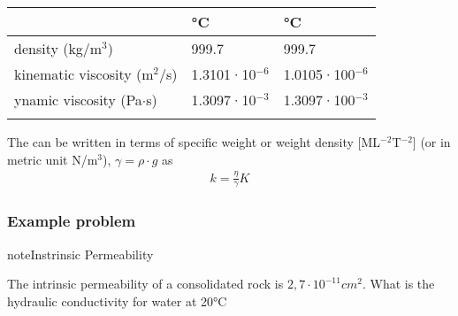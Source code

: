 \documentclass[letterpaper,10pt,english]{sphinxmanual}
\begin{document}
\begin{savenotes}\sphinxattablestart
\centering
\begin{tabulary}{\linewidth}[t]{|T|T|T|}
\hline


&°C
&°C
\\
\hline
density (kg/m\(^3\))
&
999.7
&
999.7
\\
\hline
kinematic viscosity (m\(^2\)/s)
&
1.3101·10\(^{-6}\)
&
1.0105·100\(^{-6}\)
\\
\hline
ynamic viscosity (Pa\(\cdot\)s)
&
1.3097·10\(^{-3}\)
&
1.3097·100\(^{-3}\)
\\
\hline

&

&

\\
\hline
\end{tabulary}
\par
\sphinxattableend\end{savenotes}

The  can be written in terms of specific weight or weight density {[}ML\(^{-2}\)T\(^{-2}\){]} (or in metric unit\sphinxhyphen{} N/m\(^3\)), \(\gamma = \rho\cdot g\) as
\begin{equation*}
\begin{split}
k = \frac{\eta}{\gamma}K
\end{split}
\end{equation*}

\subsubsection{Example problem}
\label{\detokenize{contents/flow/lecture_04/14_darcy_law_K:id4}}
\begin{sphinxadmonition}{note}{Instrinsic Permeability}

The intrinsic permeability of a consolidated rock is \(2,7 \cdot 10^{-11} cm^2\). What is the hydraulic conductivity for water at 20°C
\end{sphinxadmonition}
\end{document}
